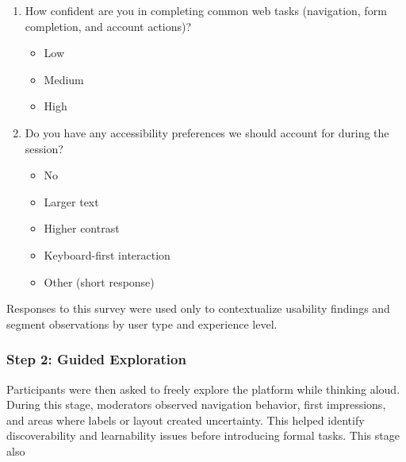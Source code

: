 \documentclass[12pt]{article}
\begin{document}
\begin{enumerate}
    \item How confident are you in completing common web tasks (navigation, form completion, and account actions)?
    \begin{itemize}[label=$\circ$]
        \item Low
        \item Medium
        \item High
    \end{itemize}
    \item Do you have any accessibility preferences we should account for during the session?
    \begin{itemize}[label=$\circ$]
        \item No
        \item Larger text
        \item Higher contrast
        \item Keyboard-first interaction
        \item Other (short response)
    \end{itemize}
\end{enumerate}

Responses to this survey were used only to contextualize usability findings and segment observations by user type and experience level.

\subsubsection{Step 2: Guided Exploration}
Participants were then asked to freely explore the platform while thinking aloud. During this stage, moderators observed navigation behavior, first impressions, and areas where labels or layout created uncertainty. This helped identify discoverability and learnability issues before introducing formal tasks. This stage also 
\end{document}
